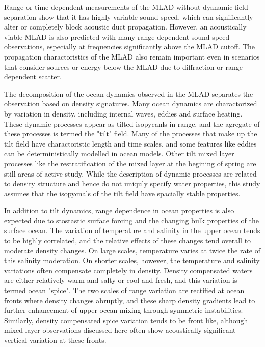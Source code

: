\documentclass[preprint,NumberedRefs]{JASA}
\begin{document}
Range or time dependent measurements of the MLAD without dyanamic field separation show that it has highly variable sound speed\citep{cole2010seasonal,rudnick1999compensation,klymak2015}, which can significantly alter or completely block acoustic duct propagation\citep{colosi2020observations,colosi21}. However, an acoustically viable MLAD is also predicted with many range dependent sound speed observations, especially at frequencies significantly above the MLAD cutoff. The propagation charactoristics of the MLAD also remain important even in scenarios that consider sources or energy below the MLAD due to diffraction or range dependent scatter\citep{colosi21}.

The decomposition of the ocean dynamics observed in the MLAD separates the observation based on density signatures. Many ocean dynamics are charactorized by variation in density, including internal waves, eddies and surface heating. These dynamic processes appear as tilted isopycanls in range, and the agregate of these processes is termed the "tilt" field\cite{dzieciuch2004}. Many of the processes that make up the tilt field have charactoristic length and time scales, and some features like eddies can be deterministically modelled in ocean models. Other tilt mixed layer processes like the restratification of the mixed layer at the begining of spring are still areas of active study\cite{cole2010seasonal}. While the description of dynamic processes are related to density structure and hence do not uniquly specify water properties, this study assumes that the isopycnals of the tilt field have spacially stable properties.

In addition to tilt dynamics, range dependence in ocean properties is also expected due to stostastic surface forcing and the changing bulk properties of the surface ocean\citep{ferrari2000}. The variation of temperature and salinity in the upper ocean tends to be highly correlated, and the relative effects of these changes tend overall to moderate density changes. On large scales, temperature varies at twice the rate of this salinity moderation. On shorter scales, however, the temperature and salinity variations often compensate completely in density. Density compensated waters are either relatively warm and salty or cool and fresh, and this variation is termed ocean "spice"\citep{munk1981evolution}. The two scales of range variation are rectified at ocean fronts where density changes abruptly, and these sharp density gradients lead to further enhancement of upper ocean mixing through symmetric instabilities\citep{dasaro2011}. Similarly, density compensated spice variation tends to be front like, although mixed layer observations discussed here often show acoustically significant vertical variation at these fronts.
\end{document}
